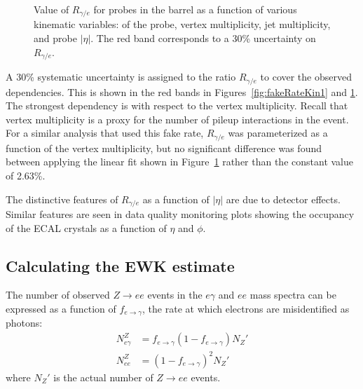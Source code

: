 \begin{figure}[h]
\begin{center}
\end{center}
\caption{Value of $R_{\gamma/e}$ for probes in the barrel as a function of various kinematic variables: \sigmaietaieta of the probe, 
vertex multiplicity, jet multiplicity, and probe $|\eta|$. The red band corresponds to a 30\% uncertainty 
on $R_{\gamma/e}$.
}
\label{fig:fakeRateKin2}
\end{figure}

A 30\% systematic uncertainty is assigned to the ratio $R_{\gamma/e}$ to cover the observed dependencies. 
This is shown in the red bands in Figures~\ref{fig:fakeRateKin1} and \ref{fig:fakeRateKin2}. The strongest dependency is with respect
to the vertex multiplicity. Recall that vertex multiplicity is a proxy for the number of pileup interactions in the event. For a similar analysis that 
used this fake rate, $R_{\gamma/e}$ was parameterized as a function of the vertex multiplicity, but no significant difference was found between 
applying the linear fit shown in Figure~\ref{fig:fakeRateKin2} rather than the constant value of 2.63\%.

The distinctive features of $R_{\gamma/e}$ as a function of $|\eta|$ are due to detector effects. Similar features are seen in data quality monitoring plots showing the occupancy of the ECAL crystals as a function of $\eta$ and $\phi$. 


\subsection{Calculating the EWK estimate}
\label{sec:transfer}
The number of observed $Z\rightarrow ee$ events in the $e\gamma$ and $ee$ mass spectra can be expressed as a function of $f_{e\rightarrow\gamma}$, the rate at which electrons are misidentified as photons:
\begin{equation}
\begin{aligned}
\label{equ:fake}
N_{e\gamma}^Z &= f_{e\rightarrow\gamma}(1- f_{e\rightarrow\gamma})N_{Z}'\\
N_{ee}^Z &= (1-f_{e\rightarrow\gamma})^2N_{Z}'
\end{aligned}
\end{equation}
where $N_{Z}'$ is the actual number of $Z\rightarrow ee$ events. 


